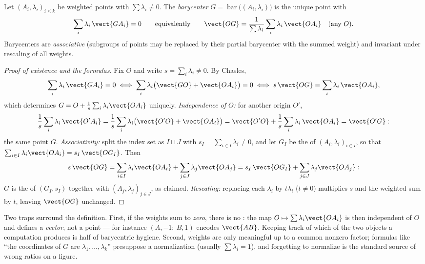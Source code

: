 \begin{definition}[Barycenter]\label{def:b2:affine:barycenter}
Let $(A_i, \lambda_i)_{i \leq k}$ be weighted points with
$\sum\lambda_i \neq 0$. The \emph{barycenter} $G
= \operatorname{bar}\bigl((A_i, \lambda_i)\bigr)$ is the unique
point with
\[
\sum_i \lambda_i\, \vect{GA_i} = 0
\qquad\text{equivalently}\qquad
\vect{OG} = \frac{1}{\sum\lambda_i}\sum_i \lambda_i\,\vect{OA_i}
\quad (\text{any } O).
\]
Barycenters are \emph{associative} (subgroups of points may be
replaced by their partial barycenter with the summed weight) and
invariant under rescaling of all weights.
\end{definition}

\begin{proof}[Proof of existence and the formulas]
Fix $O$ and write $s = \sum_i\lambda_i \neq 0$. By Chasles,
\[
\sum_i\lambda_i\,\vect{GA_i} = 0
\iff \sum_i\lambda_i\bigl(\vect{GO} + \vect{OA_i}\bigr) = 0
\iff s\,\vect{OG} = \sum_i\lambda_i\,\vect{OA_i},
\]
which determines $G = O + \frac1s\sum_i\lambda_i\vect{OA_i}$
uniquely. \emph{Independence of $O$:} for another origin
$O'$,
\[
\frac1s\sum_i\lambda_i\,\vect{O'A_i}
= \frac1s\sum_i\lambda_i\bigl(\vect{O'O} + \vect{OA_i}\bigr)
= \vect{O'O} + \frac1s\sum_i\lambda_i\,\vect{OA_i}
= \vect{O'G} :
\]
the same point $G$. \emph{Associativity:} split the index set
as $I \sqcup J$ with $s_I = \sum_{i\in I}\lambda_i \neq 0$,
and let $G_I$ be the  of $(A_i, \lambda_i)_{i\in
I}$, so that $\sum_{i\in I}\lambda_i\vect{OA_i} =
s_I\,\vect{OG_I}$. Then
\[
s\,\vect{OG}
= \sum_{i\in I}\lambda_i\vect{OA_i} +
\sum_{j\in J}\lambda_j\vect{OA_j}
= s_I\,\vect{OG_I} + \sum_{j\in J}\lambda_j\vect{OA_j} :
\]
$G$ is the  of $(G_I, s_I)$ together with $(A_j,
\lambda_j)_{j\in J}$, as claimed. \emph{Rescaling:} replacing
each $\lambda_i$ by $t\lambda_i$ ($t \neq 0$) multiplies $s$
and the weighted sum by $t$, leaving $\vect{OG}$ unchanged.
\end{proof}

\begin{remark}
Two traps surround the definition. First, if the weights sum
to \emph{zero}, there is no : the map $O \mapsto
\sum\lambda_i\vect{OA_i}$ is then independent of $O$ and
defines a \emph{vector}, not a point --- for instance
$(A, -1;\ B, 1)$ encodes $\vect{AB}$. Keeping track of which
of the two objects a computation produces is half of
barycentric hygiene. Second, weights are only meaningful up
to a common nonzero factor; formulas like ``the coordinates
of $G$ are $\lambda_1, \dots, \lambda_k$'' presuppose a
normalization (usually $\sum\lambda_i = 1$), and forgetting
to normalize is the standard source of wrong ratios on a
figure.
\end{remark}

